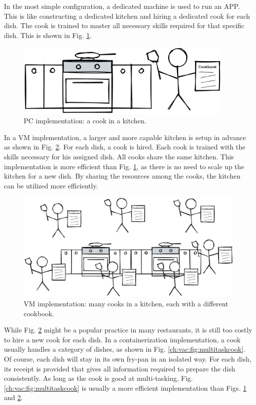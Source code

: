 In the most simple configuration, a dedicated machine is used to run an APP. This is like constructing a dedicated kitchen and hiring a dedicated cook for each dish. The cook is trained to master all necessary skills required for that specific dish. This is shown in Fig. \ref{ch:vac:fig:acookinakitchen}.
\begin{figure}[htbp]
	\centering
	\includegraphics[width=300pt]{chapters/part-3/figures/acookinakitchen.png}
	\caption{PC implementation: a cook in a kitchen.} \label{ch:vac:fig:acookinakitchen}
\end{figure}

In a VM implementation, a larger and more capable kitchen is setup in advance as shown in Fig. \ref{ch:vac:fig:manycooksinakitchen}. For each dish, a cook is hired. Each cook is trained with the skills necessary for his assigned dish. All cooks share the same kitchen. This implementation is more efficient than Fig. \ref{ch:vac:fig:acookinakitchen}, as there is no need to scale up the kitchen for a new dish. By sharing the resources among the cooks, the kitchen can be utilized more efficiently.
\begin{figure}[htbp]
	\centering \includegraphics[width=350pt]{chapters/part-3/figures/manycooksinakitchen.png}
	\caption{VM implementation: many cooks in a kitchen, each with a different cookbook.} \label{ch:vac:fig:manycooksinakitchen}
\end{figure}

While Fig. \ref{ch:vac:fig:manycooksinakitchen} might be a popular practice in many restaurants, it is still too costly to hire a new cook for each dish. In a containerization implementation, a cook usually handles a category of dishes, as shown in Fig. \ref{ch:vac:fig:multitaskcook}. Of course, each dish will stay in its own fry-pan in an isolated way. For each dish, its receipt is provided that gives all information required to prepare the dish consistently. As long as the cook is good at multi-tasking, Fig. \ref{ch:vac:fig:multitaskcook} is usually a more efficient implementation than Figs. \ref{ch:vac:fig:acookinakitchen} and \ref{ch:vac:fig:manycooksinakitchen}.

